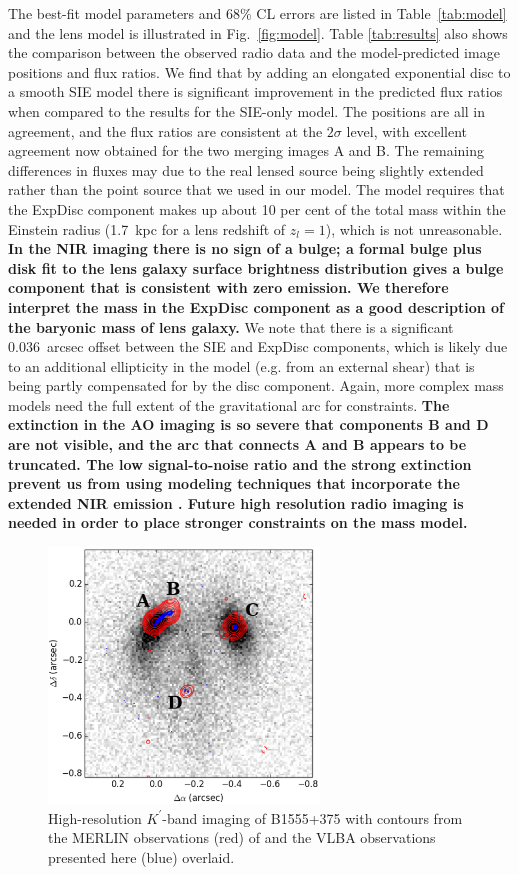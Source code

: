 \documentclass[a4paper,fleqn,usenatbib,useAMS]{mnras}
\begin{document}
The best-fit model parameters and 68\% CL errors are listed in Table~\ref{tab:model} and the lens model is illustrated in Fig.~\ref{fig:model}. Table \ref{tab:results} also shows the comparison between the observed radio data and the model-predicted image positions and flux ratios. We find that by adding an elongated exponential disc to a smooth SIE model there is significant improvement in the predicted flux ratios when compared to the results for the SIE-only model. 
The positions are all in agreement, and the flux ratios are consistent at the $2\sigma$ level, with excellent agreement now obtained for the two merging images A and B. The remaining differences in fluxes may due to the real lensed source being slightly extended rather than the point source that we used in our model. The model requires that the ExpDisc component makes up about 10 per cent of the total mass within the Einstein radius (1.7~kpc for a lens redshift of $z_l = 1$), which is not unreasonable.  {\bf In the NIR imaging there is no sign of a bulge; a formal bulge plus disk fit to the lens galaxy surface brightness distribution gives a bulge component that is consistent with zero emission.  We therefore interpret the mass in the ExpDisc component as a good description of the baryonic mass of lens galaxy.}  We note that there is a significant 0.036~arcsec offset between the SIE and ExpDisc components, which is likely due to an additional ellipticity in the model (e.g. from an external shear) that is being partly compensated for by the disc component. Again, more complex mass models need the full extent of the gravitational arc for constraints. {\bf The extinction in the AO imaging is so severe that components B and D are not visible, and the arc that connects A and B appears to be truncated.  The low signal-to-noise ratio and the strong extinction prevent us from using modeling techniques that incorporate the extended NIR emission \citep[e.g.][]{V12}.  Future high resolution radio imaging is needed in order to place stronger constraints on the mass model.}

\begin{figure}
\includegraphics[width=72mm]{fig2_twocontour_b.eps}
\caption{High-resolution $K^\prime$-band imaging of B1555+375 with contours from the MERLIN observations (red) of \citet{Marlow99} and the VLBA observations presented here (blue) overlaid.}
\label{fig:merlin}
\end{figure}
\end{document}
